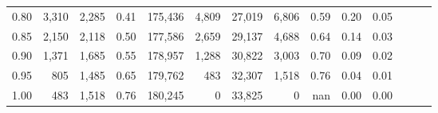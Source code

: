 \begin{tabular}{rrrrrrrrrrrrrr}
0.80 &   3,310 &  2,285 &  0.41 &  175,436 &    4,809 &  27,019 &   6,806 &  0.59 &  0.20 &      0.05 \\
0.85 &   2,150 &  2,118 &  0.50 &  177,586 &    2,659 &  29,137 &   4,688 &  0.64 &  0.14 &      0.03 \\
0.90 &   1,371 &  1,685 &  0.55 &  178,957 &    1,288 &  30,822 &   3,003 &  0.70 &  0.09 &      0.02 \\
0.95 &     805 &  1,485 &  0.65 &  179,762 &      483 &  32,307 &   1,518 &  0.76 &  0.04 &      0.01 \\
1.00 &     483 &  1,518 &  0.76 &  180,245 &        0 &  33,825 &       0 &   nan &  0.00 &      0.00 \\
\bottomrule
\end{tabular}
